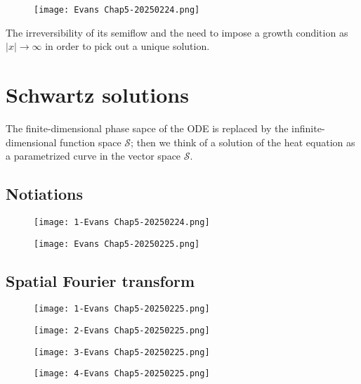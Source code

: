 \begin{figure}[H]
\centering
\texttt{[image: Evans Chap5-20250224.png]}
\label{}
\end{figure}
The irreversibility of its semiflow and the need to impose a growth condition as $\displaystyle \lvert x \rvert\to \infty$ in order to pick out a unique solution.

\section{Schwartz solutions}

The finite-dimensional phase sapce of the ODE is replaced by the infinite-dimensional function space $\displaystyle \mathcal{S}$; then we think of a solution of the heat equation as a parametrized curve in the vector space $\displaystyle \mathcal{S}$.

\subsection{Notiations}

\begin{figure}[H]
\centering
\texttt{[image: 1-Evans Chap5-20250224.png]}
\label{}
\end{figure}
\begin{figure}[H]
\centering
\texttt{[image: Evans Chap5-20250225.png]}
\label{}
\end{figure}

\subsection{Spatial Fourier transform}

\begin{figure}[H]
\centering
\texttt{[image: 1-Evans Chap5-20250225.png]}
\label{}
\end{figure}
\begin{figure}[H]
\centering
\texttt{[image: 2-Evans Chap5-20250225.png]}
\label{}
\end{figure}
\begin{figure}[H]
\centering
\texttt{[image: 3-Evans Chap5-20250225.png]}
\label{}
\end{figure}
\begin{figure}[H]
\centering
\texttt{[image: 4-Evans Chap5-20250225.png]}
\label{}
\end{figure}

